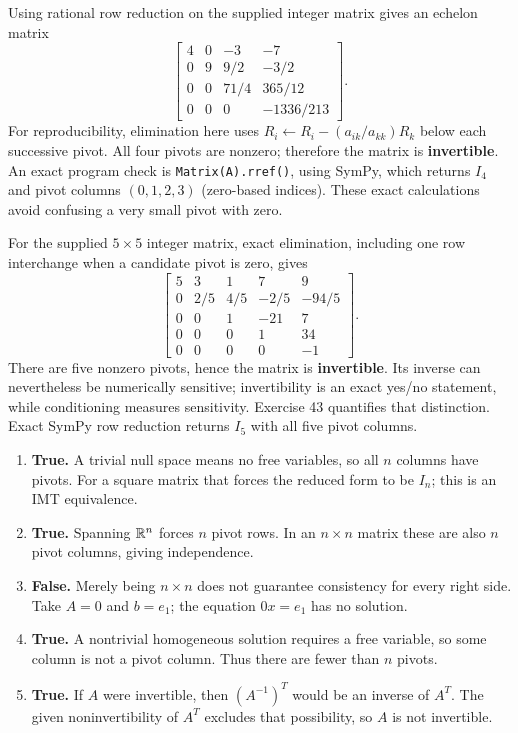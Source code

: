 Using rational row reduction on the supplied integer matrix gives an
echelon matrix
\[
 \begin{bmatrix}
 4&0&-3&-7\\0&9&9/2&-3/2\\0&0&71/4&365/12\\0&0&0&-1336/213
 \end{bmatrix}.
\]
For reproducibility, elimination here uses
$R_i\gets R_i-(a_{ik}/a_{kk})R_k$ below each successive pivot.
All four pivots are nonzero; therefore the matrix is \textbf{invertible}.
An exact program check is \texttt{Matrix(A).rref()}, using SymPy, which
returns $I_4$ and pivot columns $(0,1,2,3)$ (zero-based indices).
These exact calculations avoid confusing a very small pivot with zero.

For the supplied $5\times5$ integer matrix, exact elimination, including
one row interchange when a candidate pivot is zero, gives
\[
 \begin{bmatrix}
 5&3&1&7&9\\0&2/5&4/5&-2/5&-94/5\\
 0&0&1&-21&7\\0&0&0&1&34\\0&0&0&0&-1
 \end{bmatrix}.
\]
There are five nonzero pivots, hence the matrix is \textbf{invertible}.
Its inverse can nevertheless be numerically sensitive; invertibility is
an exact yes/no statement, while conditioning measures sensitivity.
Exercise 43 quantifies that distinction. Exact SymPy row reduction returns
$I_5$ with all five pivot columns.

\begin{enumerate}[label=(\alph*)]
\item \textbf{True.} A trivial null space means no free variables,
so all $n$ columns have pivots. For a square matrix that forces the reduced
form to be $I_n$; this is an IMT equivalence.
\item \textbf{True.} Spanning $\mathbb{R}^n$ forces $n$ pivot rows. In an
$n\times n$ matrix these are also $n$ pivot columns, giving independence.
\item \textbf{False.} Merely being $n\times n$ does not guarantee
consistency for every right side. Take $A=0$ and $b=e_1$; the equation
$0x=e_1$ has no solution.
\item \textbf{True.} A nontrivial homogeneous solution requires a free
variable, so some column is not a pivot column. Thus there are fewer than
$n$ pivots.
\item \textbf{True.} If $A$ were invertible, then
$(A^{-1})^T$ would be an inverse of $A^T$. The given noninvertibility of
$A^T$ excludes that possibility, so $A$ is not invertible.
\end{enumerate}

